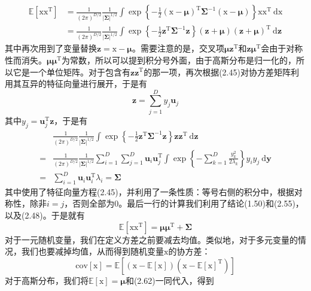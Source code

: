 \documentclass[b5paper]{book}
\numberwithin{equation}{chapter}
\newcommand {\bx} {\boldsymbol{\mathrm{x}}}
\newcommand {\rmT} {\mathrm{T}}
\newcommand {\bfMu} {\boldsymbol{\mu}}
\newcommand {\bfSigma} {\boldsymbol{\Sigma}}
\begin{document}
{	\[
	\begin{split}
		\mathbb{E}[\bx\bx^{\rmT}]&=\frac{1}{(2\pi)^{D/2}}\frac{1}{|\bfSigma|^{1/2}}\int \exp\left\{-\frac{1}{2}(\bx-\bfMu)^{\rmT}\bfSigma^{-1}(\bx-\bfMu)\right\}\bx \bx^{\rmT}\ \mathrm{d}\bx \\
		&=\frac{1}{(2\pi)^{D/2}}\frac{1}{|\bfSigma|^{1/2}}\int \exp\left\{-\frac{1}{2}\mathbf{z}^{\rmT}\bfSigma^{-1}\mathbf{z}\right\}(\mathbf{z}+\bfMu) (\mathbf{z}+\bfMu)^{\rmT}\ \mathrm{d}\mathbf{z}
	\end{split}
	\]
	其中再次用到了变量替换$\mathbf{z}=\bx-\bfMu$。需要注意的是，交叉项$\bfMu\mathbf{z}^{\rmT}$和$\mathbf{z}\bfMu^{\rmT}$会由于对称性而消失。$\bfMu\bfMu^{\rmT}$为常数，所以可以提到积分号外面，由于高斯分布是归一化的，所以它是一个单位矩阵。对于包含有$\mathbf{z}\mathbf{z}^{\rmT}$的那一项，再次根据(2.45)对协方差矩阵利用其互异的特征向量进行展开，于是有
	\begin{equation}
		\mathbf{z}=\sum_{j=1}^Dy_j\mathbf{u}_j
	\end{equation}
	其中$y_j=\mathbf{u}_j^{\rmT}\mathbf{z}$，于是有
	\begin{equation}
	\begin{split}
		&\frac{1}{(2\pi)^{D/2}}\frac{1}{|\bfSigma|^{1/2}}\int \exp \left\{-\frac{1}{2}\mathbf{z}^{\rmT}\bfSigma^{-1}\mathbf{z}\right\}\mathbf{z}\mathbf{z}^{\rmT}\ \mathrm{d}\mathbf{z}\\
		= &\frac{1}{(2\pi)^{D/2}}\frac{1}{|\bfSigma|^{1/2}}\sum_{i=1}^D \sum_{j=1}^D \mathbf{u}_i\mathbf{u}_j^{\rmT}\int \exp\left\{-\sum_{k=1}^D \frac{y_k^2}{2\lambda_k}\right\}y_iy_j\ \mathrm{d}\mathbf{y}\\
		= &\sum_{i=1}^D\mathbf{u}_i\mathbf{u}_i^{\rmT}\lambda_i = \bfSigma
	\end{split}
	\end{equation}
	其中使用了特征向量方程(2.45)，并利用了一条性质：等号右侧的积分中，根据对称性，除非$i=j$，否则全部为0。最后一行的计算我们利用了结论(1.50)和(2.55)，以及(2.48)。于是就有
	\begin{equation}
		\mathbb{E}[\bx\bx^{\rmT}]=\bfMu\bfMu^{\rmT}+\bfSigma
	\end{equation}
	\indent 对于一元随机变量，我们在定义方差之前要减去均值。类似地，对于多元变量的情况，我们也要减掉均值，从而得到随机变量$\bx$的协方差：
	\begin{equation}
		\mathrm{cov}[\bx]=\mathbb{E}\left[(\bx-\mathbb{E}[\bx])(\bx-\mathbb{E}[\bx]^{\rmT})\right]
	\end{equation}
	对于高斯分布，我们将$\mathbb{E}[\bx]=\bfMu$和(2.62)一同代入，得到
	\begin{equation}

\end{equation}}
\end{document}
